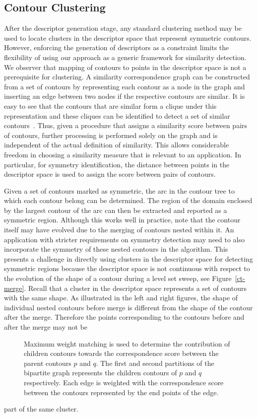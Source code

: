 \documentclass[review,journal]{vgtc}         %
\begin{document}
\subsection{Contour Clustering}\label{clus}
After the descriptor generation stage, any standard clustering method may be used to
locate clusters in the descriptor space that represent symmetric contours. However,
enforcing the generation of descriptors as a constraint limits the flexibility of 
using our approach as a generic framework for similarity detection. We observer that mapping of
contours to points in the
descriptor space is not a prerequisite for clustering. A similarity correspondence
graph can be constructed from a set of contours by representing each contour
as a node in the graph and inserting an edge between two nodes if the respective
contours are similar. It is easy to see that the contours that are similar form
a clique under this representation and these cliques can be identified to detect
a set of similar contours~\cite{Lip10}. Thus, given a procedure that assigns a similarity 
score between pairs of contours, further processing is performed 
solely on the graph and is independent of the actual definition of similarity.
This allows considerable freedom in choosing a similarity measure that is relevant to an application.
In particular, for symmetry identification, the distance between points in the descriptor space is
used to assign the score between pairs of contours. 

Given a set of contours marked as symmetric, the arc in the contour tree 
to which each contour belong can be determined. The region of the domain
enclosed by the largest contour of the arc can then be extracted and reported
as a symmetric region. Although this works well in practice, note that the contour
itself may have evolved due to the merging of contours nested within it.
An application with stricter requirements on symmetry detection may need to
also incorporate the symmetry of these nested contours in the algorithm. 
This presents a challenge in directly using clusters in the descriptor space 
for detecting symmetric regions because the descriptor space is not continuous with 
respect to the evolution of the shape of a contour during a level set sweep, 
see Figure~\ref{ct-merge}. Recall that a cluster in the descriptor space represents a
set of contours with the same shape. As illustrated in the left and right
figures, the shape of individual nested contours
before merge is different from the shape of the contour after the merge.
Therefore the points corresponding to the contours before and after the merge may not be
\begin{figure}[t]
\centering
\caption{\label{bip}Maximum weight matching is used to determine the contribution of children
	contours towards the correspondence score between the parent contours $p$ and $q$. The
	first and second partitions of the bipartite graph represents the children contours of $p$
	and $q$ respectively. Each edge is weighted with the correspondence score between the
	contours represented by the end points of the edge.}
\end{figure}
part of the same cluster. 
\end{document}
